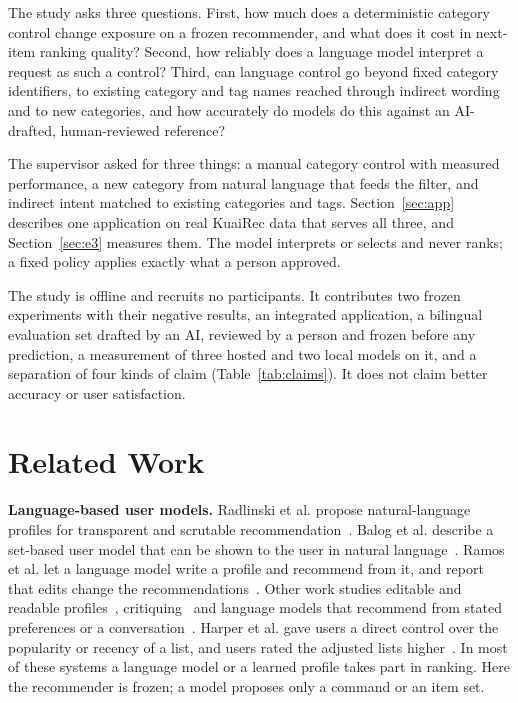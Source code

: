 \documentclass[conference]{IEEEtran}
\begin{document}
The study asks three questions. First, how much does a deterministic category control change exposure on a frozen recommender, and what does it cost in next-item ranking quality? Second, how reliably does a language model interpret a request as such a control? Third, can language control go beyond fixed category identifiers, to existing category and tag names reached through indirect wording and to new categories, and how accurately do models do this against an AI-drafted, human-reviewed reference?

The supervisor asked for three things: a manual category control with measured performance, a new category from natural language that feeds the filter, and indirect intent matched to existing categories and tags. Section~\ref{sec:app} describes one application on real KuaiRec data that serves all three, and Section~\ref{sec:e3} measures them. The model interprets or selects and never ranks; a fixed policy applies exactly what a person approved.

The study is offline and recruits no participants. It contributes two frozen experiments with their negative results, an integrated application, a bilingual evaluation set drafted by an AI, reviewed by a person and frozen before any prediction, a measurement of three hosted and two local models on it, and a separation of four kinds of claim (Table~\ref{tab:claims}). It does not claim better accuracy or user satisfaction.

\section{Related Work}
\textbf{Language-based user models.} Radlinski et al. propose natural-language profiles for transparent and scrutable recommendation~\cite{radlinski2022profiles}. Balog et al. describe a set-based user model that can be shown to the user in natural language~\cite{balog2019transparent}. Ramos et al. let a language model write a profile and recommend from it, and report that edits change the recommendations~\cite{ramos2024transparent}. Other work studies editable and readable profiles~\cite{wozniak2025profiles,zhou2024language,mysore2023editable}, critiquing~\cite{chen2012critiquing} and language models that recommend from stated preferences or a conversation~\cite{sanner2023competitive,he2023zeroshot}. Harper et al. gave users a direct control over the popularity or recency of a list, and users rated the adjusted lists higher~\cite{harper2015control}. In most of these systems a language model or a learned profile takes part in ranking. Here the recommender is frozen; a model proposes only a command or an item set.
\end{document}
